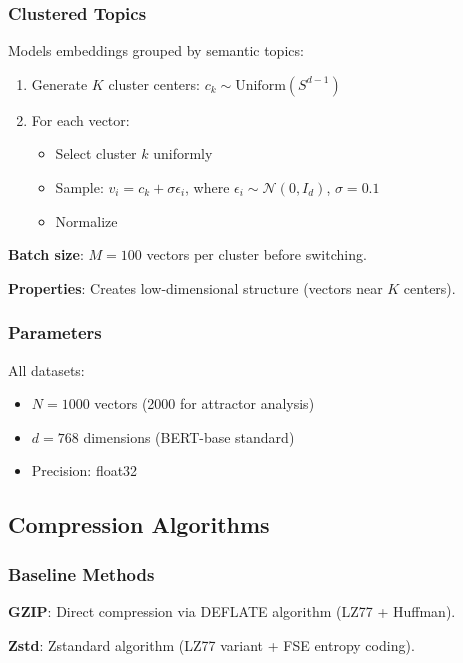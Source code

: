 \documentclass[11pt,a4paper]{article}
\begin{document}
\subsubsection{Clustered Topics}

Models embeddings grouped by semantic topics:

\begin{enumerate}
\item Generate $K$ cluster centers: $c_k \sim \text{Uniform}(S^{d-1})$
\item For each vector:
   \begin{itemize}
   \item Select cluster $k$ uniformly
   \item Sample: $v_i = c_k + \sigma \epsilon_i$, where $\epsilon_i \sim \mathcal{N}(0, I_d)$, $\sigma = 0.1$
   \item Normalize
   \end{itemize}
\end{enumerate}

\textbf{Batch size}: $M = 100$ vectors per cluster before switching.

\textbf{Properties}: Creates low-dimensional structure (vectors near $K$ centers).

\subsubsection{Parameters}

All datasets:
\begin{itemize}
\item $N = 1000$ vectors (2000 for attractor analysis)
\item $d = 768$ dimensions (BERT-base standard)
\item Precision: float32
\end{itemize}

\subsection{Compression Algorithms}

\subsubsection{Baseline Methods}

\textbf{GZIP}: Direct compression via DEFLATE algorithm (LZ77 + Huffman).

\textbf{Zstd}: Zstandard algorithm (LZ77 variant + FSE entropy coding).
\end{document}
